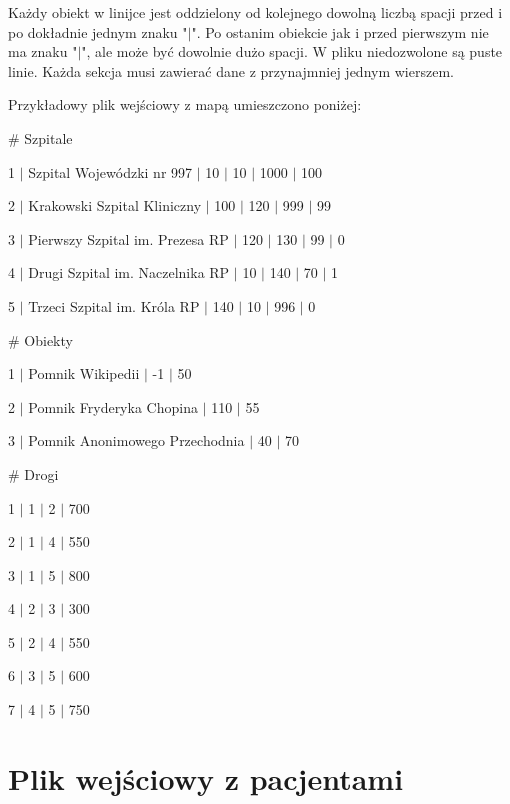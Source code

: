 \documentclass[10pt,a4paper]{article}
\begin{document}
Każdy obiekt w linijce jest oddzielony od kolejnego dowolną liczbą spacji przed i po dokładnie jednym znaku "$\mid$". Po ostanim obiekcie jak i przed pierwszym nie ma znaku "$\mid$", ale może być dowolnie dużo spacji. W pliku niedozwolone są puste linie. Każda sekcja musi zawierać dane z przynajmniej jednym wierszem.

Przykładowy plik wejściowy z mapą umieszczono poniżej:
\begin{description}[style=multiline,leftmargin=3cm]
\item \# Szpitale
\item 1 $\mid$ Szpital Wojewódzki nr 997 $\mid$ 10 $\mid$ 10 $\mid$ 1000 $\mid$ 100
\item 2 $\mid$ Krakowski Szpital Kliniczny $\mid$ 100 $\mid$ 120 $\mid$ 999 $\mid$ 99
\item 3 $\mid$ Pierwszy Szpital im. Prezesa RP $\mid$ 120 $\mid$ 130 $\mid$ 99 $\mid$ 0
\item 4 $\mid$ Drugi Szpital im. Naczelnika RP $\mid$ 10 $\mid$ 140 $\mid$ 70 $\mid$ 1
\item 5 $\mid$ Trzeci Szpital im. Króla RP $\mid$ 140 $\mid$ 10 $\mid$ 996 $\mid$ 0
\item \# Obiekty 
\item 1 $\mid$ Pomnik Wikipedii $\mid$ -1 $\mid$ 50
\item 2 $\mid$ Pomnik Fryderyka Chopina $\mid$ 110 $\mid$ 55
\item 3 $\mid$ Pomnik Anonimowego Przechodnia $\mid$ 40 $\mid$ 70
\item \# Drogi
\item 1 $\mid$ 1 $\mid$ 2 $\mid$ 700
\item 2 $\mid$ 1 $\mid$ 4 $\mid$ 550
\item 3 $\mid$ 1 $\mid$ 5 $\mid$ 800
\item 4 $\mid$ 2 $\mid$ 3 $\mid$ 300
\item 5 $\mid$ 2 $\mid$ 4 $\mid$ 550
\item 6 $\mid$ 3 $\mid$ 5 $\mid$ 600
\item 7 $\mid$ 4 $\mid$ 5 $\mid$ 750
\end{description}

\section{Plik wejściowy z pacjentami}
\end{document}
